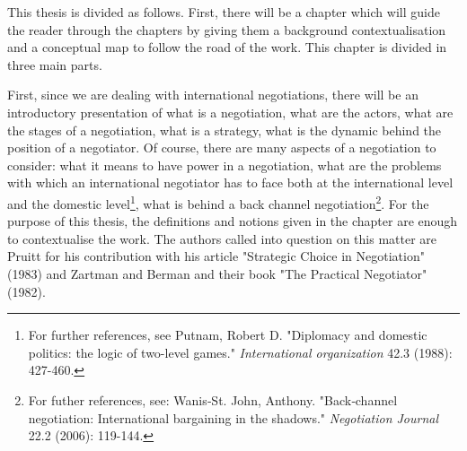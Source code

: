 ﻿\documentclass[../main.tex]{subfiles}
\begin{document}
This thesis is divided as follows. First, there will be a chapter which will guide the reader through the chapters by giving them a background contextualisation and a  conceptual map to follow the road of the work. 
This chapter is divided in three main parts.

First, since we are dealing with international negotiations, there will be an introductory presentation of what is a negotiation, what are the actors, what are the stages of a negotiation, what is a strategy, what is the dynamic behind the position of a negotiator. Of course, there are many aspects of a negotiation to consider: what it means to have power in a negotiation, what are the problems with which an international negotiator has to face both at the international level and the domestic level\footnote{For further references, see Putnam, Robert D. "Diplomacy and domestic politics: the logic of two-level games." \textit{International organization} 42.3 (1988): 427-460.}, what is behind a back channel negotiation\footnote{For futher references, see: Wanis‐St. John, Anthony. "Back‐channel negotiation: International bargaining in the shadows." \textit{Negotiation Journal} 22.2 (2006): 119-144.}.
For the purpose of this thesis, the definitions and notions given in the chapter are enough to contextualise the work.
The authors called into question on this matter are Pruitt for his contribution with his article "Strategic Choice in Negotiation" (1983) and Zartman and Berman and their book "The Practical Negotiator" (1982).
\end{document}
